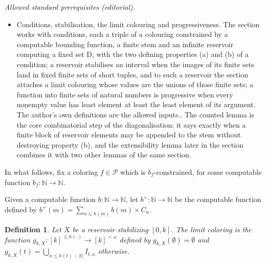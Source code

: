 \documentclass{article}
\def\P{\mathcal{P}}
\newcommand{\uh}{\upharpoonright}
\newcommand{\NN}[0]{\mathbb{N}}
\numberwithin{theorem}{section}
\newtheorem{lemma}[theorem]{Lemma}
\newtheorem{definition}[theorem]{Definition}
\begin{document}
\noindent\textit{Allowed standard prerequisites (editorial).}\begin{itemize}
\item Conditions, stabilisation, the limit colouring and progressiveness. The section works with conditions, each a triple of a colouring constrained by a computable bounding function, a finite stem and an infinite reservoir computing a fixed set D, with the two defining properties (a) and (b) of a condition; a reservoir stabilises an interval when the images of its finite sets land in fixed finite sets of short tuples, and to such a reservoir the section attaches a limit colouring whose values are the unions of those finite sets; a function into finite sets of natural numbers is progressive when every nonempty value has least element at least the least element of its argument. The author's own definitions are the allowed inputs.. The counted lemma is the core combinatorial step of the diagonalisation: it says exactly when a finite block of reservoir elements may be appended to the stem without destroying property (b), and the extensibility lemma later in the section combines it with two other lemmas of the same section.
\end{itemize}\medskip
In what follows, fix a coloring $f \in \P$ which is $b_f$-constrained, for some computable function $b_f : \NN \to \NN$.

Given a computable function $b : \NN \to \NN$, let $b ^{+} : \NN \to \NN$ be the computable function defined by  $b^{+}(m) = \sum_{n \leq h(m)} b(m) \times C_n$.

\begin{definition}
Let $X$ be a reservoir stabilizing $[0, k]$. The \emph{limit coloring} is the function $g_{k,X} : [k]^{\leq h(\cdot)} \to [k]^{<\omega}$ defined by $g_{k,X}(\emptyset) = \emptyset$ and $g_{k,X}(t) = \bigcup_{n \leq h(t) - |t|} I_{t, n}$ otherwise.
\end{definition}

\end{document}
